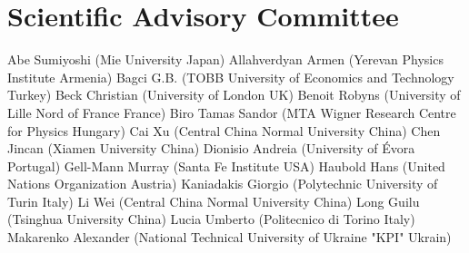 \documentclass[oneside,A4paper,12pt]{article}
\begin{document}
\newpage

\section*{Scientific Advisory Committee}
\label{sec:org523411c}
\begin{flushleft}
 Abe Sumiyoshi (Mie University                                        Japan)                       \newline
 Allahverdyan Armen (Yerevan Physics Institute                        Armenia)                     \newline
 Bagci G.B. (TOBB University of Economics and Technology              Turkey)                      \newline
 Beck Christian (University of London                                 UK)                          \newline
 Benoit Robyns (University of Lille Nord of France                    France)                      \newline
 Biro Tamas Sandor (MTA Wigner Research Centre for Physics            Hungary)                     \newline
 Cai Xu (Central China Normal University                              China)                       \newline
 Chen Jincan (Xiamen University                                       China)                       \newline
 Dionisio Andreia (University of Évora                                Portugal)                    \newline
 Gell-Mann Murray (Santa Fe Institute                                 USA)                         \newline
 Haubold Hans (United Nations Organization                            Austria)                     \newline
 Kaniadakis Giorgio (Polytechnic University of Turin                  Italy)                       \newline
 Li Wei (Central China Normal University                              China)                       \newline
 Long Guilu (Tsinghua University                                      China)                       \newline
 Lucia Umberto (Politecnico di Torino                                 Italy)                       \newline
 Makarenko Alexander (National Technical University of Ukraine "KPI"  Ukrain)                      \newline

\end{flushleft}
\end{document}
